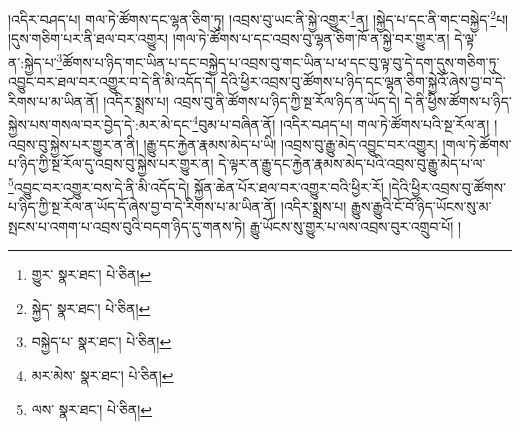 །འདིར་བཤད་པ། གལ་ཏེ་ཚོགས་དང་ལྷན་ཅིག་ཏུ། །འབྲས་བུ་ཡང་ནི་སྐྱེ་འགྱུར་\footnote{གྱུར་  སྣར་ཐང་།  པེ་ཅིན། }ན། །སྐྱེད་པ་དང་ནི་གང་བསྐྱེད་\footnote{སྐྱེད་  སྣར་ཐང་།  པེ་ཅིན། }པ། །དུས་གཅིག་པར་ནི་ཐལ་བར་འགྱུར། །གལ་ཏེ་ཚོགས་པ་དང་འབྲས་བུ་ལྷན་ཅིག་ཁོ་ན་སྐྱེ་བར་གྱུར་ན། དེ་ལྟ་ན་:སྐྱེད་པ་\footnote{བསྐྱེད་པ་  སྣར་ཐང་།  པེ་ཅིན། }ཚོགས་པ་ཉིད་གང་ཡིན་པ་དང་བསྐྱེད་པ་འབྲས་བུ་གང་ཡིན་པ་ཕ་དང་བུ་ལྟ་བུ་དེ་དག་དུས་གཅིག་ཏུ་འབྱུང་བར་ཐལ་བར་འགྱུར་བ་དེ་ནི་མི་འདོད་དེ། དེའི་ཕྱིར་འབྲས་བུ་ཚོགས་པ་ཉིད་དང་ལྷན་ཅིག་སྐྱེའོ་ཞེས་བྱ་བ་དེ་རིགས་པ་མ་ཡིན་ནོ། །འདིར་སྨྲས་པ། འབྲས་བུ་ནི་ཚོགས་པ་ཉིད་ཀྱི་སྔ་རོལ་ཉིད་ན་ཡོད་དེ། དེ་ནི་ཕྱིས་ཚོགས་པ་ཉིད་སྐྱེས་པས་གསལ་བར་བྱེད་དེ་:མར་མེ་དང་\footnote{མར་མེས་  སྣར་ཐང་།  པེ་ཅིན། }བུམ་པ་བཞིན་ནོ། །འདིར་བཤད་པ། གལ་ཏེ་ཚོགས་པའི་སྔ་རོལ་ན། །འབྲས་བུ་སྐྱེས་པར་གྱུར་ན་ནི། །རྒྱུ་དང་རྐྱེན་རྣམས་མེད་པ་ཡི། །འབྲས་བུ་རྒྱུ་མེད་འབྱུང་བར་འགྱུར། །གལ་ཏེ་ཚོགས་པ་ཉིད་ཀྱི་སྔ་རོལ་དུ་འབྲས་བུ་སྐྱེས་པར་གྱུར་ན། དེ་ལྟར་ན་རྒྱུ་དང་རྐྱེན་རྣམས་མེད་པའི་འབྲས་བུ་རྒྱུ་མེད་པ་ལ་\footnote{ལས་  སྣར་ཐང་།  པེ་ཅིན། }འབྱུང་བར་འགྱུར་བས་དེ་ནི་མི་འདོད་དེ། སྐྱོན་ཆེན་པོར་ཐལ་བར་འགྱུར་བའི་ཕྱིར་རོ། །དེའི་ཕྱིར་འབྲས་བུ་ཚོགས་པ་ཉིད་ཀྱི་སྔ་རོལ་ན་ཡོད་དོ་ཞེས་བྱ་བ་དེ་རིགས་པ་མ་ཡིན་ནོ། །འདིར་སྨྲས་པ། རྒྱུས་རྒྱུའི་ངོ་བོ་ཉིད་ཡོངས་སུ་མ་སྤངས་པ་འགག་པ་འབྲས་བུའི་བདག་ཉིད་དུ་གནས་ཏེ། རྒྱུ་ཡོངས་སུ་གྱུར་པ་ལས་འབྲས་བུར་འགྲུབ་པོ། །
